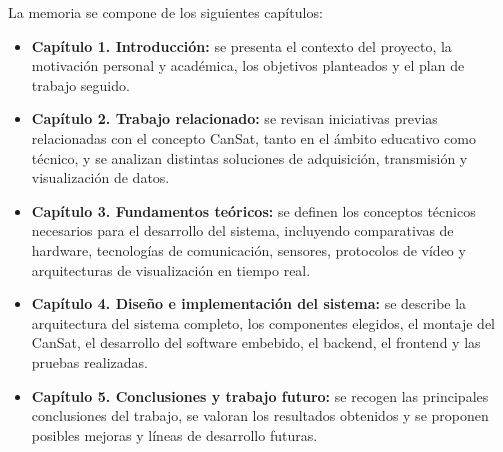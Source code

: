 La memoria se compone de los siguientes capítulos:

\begin{itemize}
    \item \textbf{Capítulo 1. Introducción:} se presenta el contexto del proyecto, la motivación personal y académica, los objetivos planteados y el plan de trabajo seguido.

    \item \textbf{Capítulo 2. Trabajo relacionado:} se revisan iniciativas previas relacionadas con el concepto CanSat, tanto en el ámbito educativo como técnico, y se analizan distintas soluciones de adquisición, transmisión y visualización de datos.

    \item \textbf{Capítulo 3. Fundamentos teóricos:} se definen los conceptos técnicos necesarios para el desarrollo del sistema, incluyendo comparativas de hardware, tecnologías de comunicación, sensores, protocolos de vídeo y arquitecturas de visualización en tiempo real.

    \item \textbf{Capítulo 4. Diseño e implementación del sistema:} se describe la arquitectura del sistema completo, los componentes elegidos, el montaje del CanSat, el desarrollo del software embebido, el backend, el frontend y las pruebas realizadas.

    \item \textbf{Capítulo 5. Conclusiones y trabajo futuro:} se recogen las principales conclusiones del trabajo, se valoran los resultados obtenidos y se proponen posibles mejoras y líneas de desarrollo futuras.
\end{itemize}